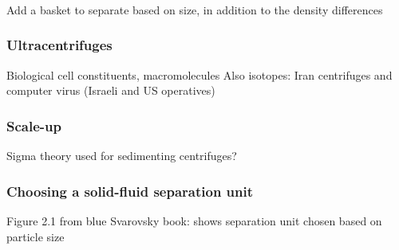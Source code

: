 \begin{frame}\frametitle{}
	Add a basket to separate based on size, in addition to the density differences
\end{frame}

\begin{frame}\frametitle{Ultracentrifuges}
	Biological cell constituents, macromolecules
	Also isotopes: Iran centrifuges and computer virus (Israeli and US operatives)
\end{frame}

\begin{frame}\frametitle{Scale-up}
	Sigma theory used for sedimenting centrifuges?
\end{frame}


\begin{frame}\frametitle{Choosing a solid-fluid separation unit}
	Figure 2.1 from blue Svarovsky book: shows separation unit chosen based on particle size
\end{frame}